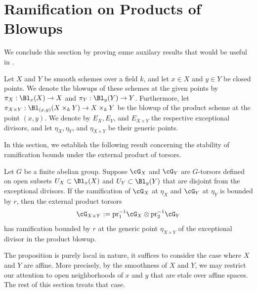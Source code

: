 \section{Ramification on Products of Blowups}\label{subsection:ram_prod_analysis}
We conclude this sesction by proving sume auxilary results that would be useful in .



Let $X$ and $Y$ be smooth schemes over a field $k$, and let $x \in X$ and $y \in Y$ be closed points. 
We denote the blowups of these schemes at the given points by 
$\pi_X: \Bl_x(X) \to X$ and $\pi_Y: \Bl_y(Y) \to Y$. Furthermore, let $\pi_{X \times Y}: \Bl_{(x,y)}(X \times_k Y) \to X \times_k Y$ 
be the blowup of the product scheme at the point $(x,y)$.
We denote by $E_X, E_Y$, and $E_{X \times Y}$ the respective exceptional divisors, and let $\eta_X, \eta_Y$, and $\eta_{X \times Y}$ be their generic points.

In this section, we establish the following result concerning the stability of ramification bounds under the external product of torsors.

\begin{prop}\label{prop:ramification-external-product}
Let $G$ be a finite abelian group. Suppose $\cG_X$ and $\cG_Y$ are $G$-torsors defined on open subsets $U_X \subset \Bl_x(X)$ and $U_Y \subset \Bl_y(Y)$ that are disjoint 
from the exceptional divisors. 
If the ramification of $\cG_X$ at $\eta_X$ and $\cG_Y$ at $\eta_Y$ is bounded by $r$, then the external product torsors 
\[
\cG_{X \times Y} := \text{pr}_1^{-1} \cG_X \otimes \text{pr}_2^{-1} \cG_Y
\]
has ramification bounded by $r$ at the generic point $\eta_{X\times Y}$ of the exceptional divisor in the product blowup.
\end{prop}

The proposition is purely local in nature, it suffices to consider the case where $X$ and $Y$ are affine. 
More precisely, by the smoothness of $X$ and $Y$, we may restrict our attention to open neighborhoods of $x$ and $y$ that are etale over affine spaces. 
The rest of this section treats that case.


